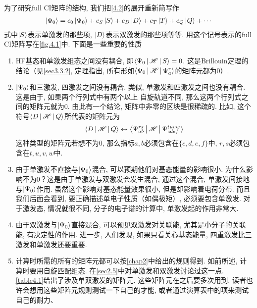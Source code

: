 为了研究full CI矩阵的结构, 我们把\eqref{4.2}的展开重新简写作
\begin{align}
\Ket{\Phi_0} = c_0\Ket{\Psi_0} + c_S\Ket{S}+c_D\Ket{D} + c_T\Ket{T} + c_Q\Ket{Q} + \cdots
\end{align}
式中$\Ket{S}$表示单激发的那些项, $\Ket{D}$表示双激发的那些项等等. 用这个记号表示的full CI矩阵写在\ref{fig.4.1}中. 下面是一些重要的性质
\begin{enumerate}[1.]
	\item HF基态和单激发组态之间没有耦合, 即$\Braket{\Psi_0|\mathscr{H}|S}=0$. 这是Brillouin定理的结论（见\ref{sec3.3.2}, 定理指出, 所有形如$\Braket{\Psi_0|\mathscr{H}|\Psi_a^r}$的矩阵元都为0）.
	\item
	$\Ket{\Psi_0}$和三激发, 四激发之间没有耦合. 类似, 单激发和四激发之间也没有耦合. 这是由于, 如果两个行列式中有两个以上 自旋轨道不同, 那么这两个行列式之间的\ha 矩阵元就为0. 由此有一个结论, 矩阵中非零的区块是很稀疏的. 比如, 这个符号$\Braket{D|\mathscr{H}|Q}$所代表的矩阵元为
	\begin{align*}
	\Braket{D|\mathscr{H}|Q} \leftrightarrow \Braket{\Psi_{ab}^{rs}|\mathscr{H}|\Psi_{cdef}^{tuvw}}
	\end{align*}
	这种类型的矩阵元若想不为0, 那么指标$a,b$必须包含在$\{c,d,e,f\}$中, $r,s$必须包含在$t,u,v,w$中.
	
	\item
	由于单激发不直接与$\Ket{\Psi_0}$混合, 可以预期他们对基态能量的影响很小. 为什么影响不为0？这是由于单激发与双激发会发生混合, 通过这个混合, 单激发间接地与$\Ket{\Psi_0}$作用. 虽然这个影响对基态能量效果很小, 但是却影响着电荷分布. 而且我们后面会看到, 要正确描述单电子性质（如偶极矩）, 必须要包含单激发. 对于激发态, 情况就很不同, 分子的电子谱的计算中, 单激发起的作用非常大.
	\item 
	由于双激发与$\Ket{\Psi_0}$直接混合, 可以预见双激发对关联能, 尤其是小分子的关联能, 有决定性的作用. 进一步, 人们发现, 如果只看关心基态能量, 四重激发比三激发和单激发还要重要.
	\item
	计算时所需的所有的矩阵元都可以按\ref{chap2}中给出的规则得到. 如前所述, 计算时要用自旋匹配组态. 在\ref{sec2.5}中对单激发和双激发讨论过这一点. \ref{table4.1}给出了涉及单双激发的矩阵元. 这些矩阵元在之后要多次用到. 读者也许会想用这些矩阵元规则测试一下自己的才能, 或者通过演算表中的项来测试自己的耐力、
\end{enumerate}
